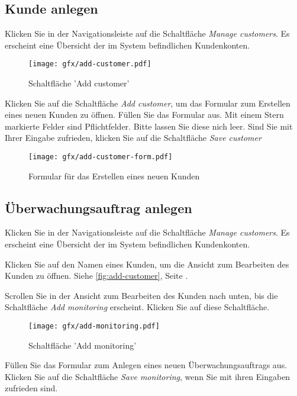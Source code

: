 \subsection{Kunde anlegen}

Klicken Sie in der Navigationsleiste auf die Schaltfläche \textit{Manage
customers}. Es erscheint eine Übersicht der im System befindlichen Kundenkonten.

\begin{figure}[H]
  \texttt{[image: gfx/add-customer.pdf]}
  \caption{Schaltfläche 'Add customer'}
  \label{fig:add-customer}
\end{figure}

Klicken Sie auf die Schaltfläche \textit{Add customer}, um das Formular zum
Erstellen eines neuen Kunden zu öffnen. Füllen Sie das Formular aus. Mit einem
Stern markierte Felder sind Pflichtfelder. Bitte lassen Sie diese nich leer.
Sind Sie mit Ihrer Eingabe zufrieden, klicken Sie auf die Schaltfläche
\textit{Save customer}

\begin{figure}[H]
  \texttt{[image: gfx/add-customer-form.pdf]}
  \caption{Formular für das Erstellen eines neuen Kunden}
  \label{fig:add-customer-form}
\end{figure}

\subsection{Überwachungsauftrag anlegen}

Klicken Sie in der Navigationsleiste auf die Schaltfläche \textit{Manage
customers}. Es erscheint eine Übersicht der im System befindlichen Kundenkonten.

Klicken Sie auf den Namen eines Kunden, um die Ansicht zum Bearbeiten des Kunden
zu öffnen. Siehe \autoref{fig:add-customer}, Seite \pageref{fig:add-customer}.

Scrollen Sie in der Ansicht zum Bearbeiten des Kunden nach unten, bis die
Schaltfläche \textit{Add monitoring} erscheint. Klicken Sie auf diese
Schaltfläche.

\begin{figure}[H]
  \texttt{[image: gfx/add-monitoring.pdf]}
  \caption{Schaltfläche 'Add monitoring'}
  \label{fig:add-monitoring}
\end{figure}

Füllen Sie das Formular zum Anlegen eines neuen Überwachungsauftrags aus.
Klicken Sie auf die Schaltfläche \textit{Save monitoring}, wenn Sie mit ihren
Eingaben zufrieden sind.

